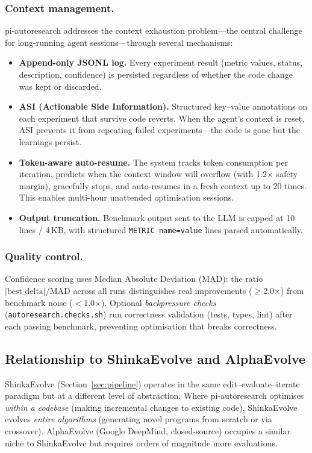 \documentclass[11pt,a4paper]{article}
\begin{document}
\subsubsection{Context management.}
pi-autoresearch addresses the context exhaustion problem---the central
challenge for long-running agent sessions---through several mechanisms:

\begin{itemize}[nosep]
  \item \textbf{Append-only JSONL log.} Every experiment result (metric
    values, status, description, confidence) is persisted regardless of
    whether the code change was kept or discarded.
  \item \textbf{ASI (Actionable Side Information).} Structured
    key--value annotations on each experiment that survive code reverts.
    When the agent's context is reset, ASI prevents it from repeating
    failed experiments---the code is gone but the learnings persist.
  \item \textbf{Token-aware auto-resume.} The system tracks token
    consumption per iteration, predicts when the context window will
    overflow (with 1.2$\times$ safety margin), gracefully stops, and
    auto-resumes in a fresh context up to 20 times. This enables
    multi-hour unattended optimisation sessions.
  \item \textbf{Output truncation.} Benchmark output sent to the LLM is
    capped at 10 lines / 4\,KB, with structured \texttt{METRIC
    name=value} lines parsed automatically.
\end{itemize}

\subsubsection{Quality control.}
Confidence scoring uses Median Absolute Deviation (MAD): the ratio
$|\text{best\_delta}| / \text{MAD}$ across all runs distinguishes real
improvements ($\geq$2.0$\times$) from benchmark noise ($<$1.0$\times$).
Optional \emph{backpressure checks} (\texttt{autoresearch.checks.sh})
run correctness validation (tests, types, lint) after each passing
benchmark, preventing optimisation that breaks correctness.

\subsection{Relationship to ShinkaEvolve and AlphaEvolve}

ShinkaEvolve (Section~\ref{sec:pipeline}) operates in the same
edit--evaluate--iterate paradigm but at a different level of
abstraction. Where pi-autoresearch optimises \emph{within a codebase}
(making incremental changes to existing code), ShinkaEvolve evolves
\emph{entire algorithms} (generating novel programs from scratch or via
crossover). AlphaEvolve (Google DeepMind, closed-source) occupies a
similar niche to ShinkaEvolve but requires orders of magnitude more
evaluations.
\end{document}
